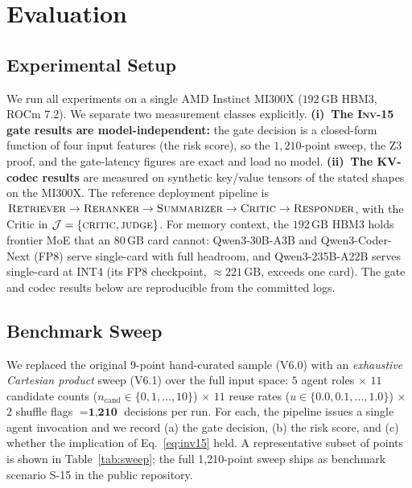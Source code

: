 \documentclass[10pt,twocolumn]{article}
\newcommand{\INV}[1]{\textsc{Inv-#1}}
\newcommand{\Judge}{\mathcal{J}}
\newcommand{\Cand}{n_{\text{cand}}}
\newcommand{\Reuse}{u}
\begin{document}
\section{Evaluation}
\label{sec:eval}

\subsection{Experimental Setup}
\label{sec:eval:setup}

We run all experiments on a single AMD Instinct MI300X
($192\,\mathrm{GB}$ HBM3, ROCm 7.2). We separate two measurement classes
explicitly. \textbf{(i)~The \INV{15} gate results are model-independent:}
the gate decision is a closed-form function of four input features (the
risk score), so the $1{,}210$-point sweep, the Z3 proof, and the
gate-latency figures are exact and load no model. \textbf{(ii)~The KV-codec
results} are measured on synthetic key/value tensors of the stated shapes on
the MI300X. The reference deployment pipeline is
$\textsc{Retriever} \to \textsc{Reranker} \to \textsc{Summarizer} \to
\textsc{Critic} \to \textsc{Responder}$, with the Critic in
$\Judge = \{\textsc{critic}, \textsc{judge}\}$. For memory context, the
$192\,\mathrm{GB}$ HBM3 holds frontier MoE that an $80\,\mathrm{GB}$ card
cannot: Qwen3-30B-A3B and Qwen3-Coder-Next (FP8) serve single-card with full
headroom, and Qwen3-235B-A22B serves single-card at INT4 (its FP8 checkpoint,
$\approx\!221\,\mathrm{GB}$, exceeds one card). The gate and codec results
below are reproducible from the committed logs.

\subsection{Benchmark Sweep}
\label{sec:eval:sweep}

We replaced the original 9-point hand-curated sample (V6.0) with an
\emph{exhaustive Cartesian product} sweep (V6.1) over the full input
space: $5$ agent roles $\times$ $11$ candidate counts ($\Cand \in
\{0, 1, \ldots, 10\}$) $\times$ $11$ reuse rates ($\Reuse \in
\{0.0, 0.1, \ldots, 1.0\}$) $\times$ $2$ shuffle flags $=
\textbf{1{,}210}$ decisions per run. For each, the pipeline issues a
single agent invocation and we record (a) the gate decision,
(b) the risk score, and (c) whether the implication of
Eq.~\ref{eq:inv15} held. A representative subset of points is shown
in Table~\ref{tab:sweep}; the full 1{,}210-point sweep ships as
benchmark scenario S-15 in the public repository.
\end{document}
